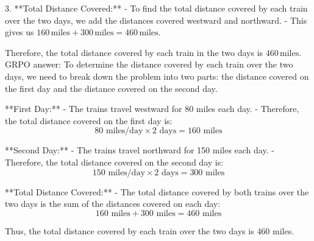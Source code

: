\documentclass[11pt]{article}
\begin{document}
\begin{answerbox}
3. **Total Distance Covered:**
   - To find the total distance covered by each train over the two days, we add the distances covered westward and northward.
   - This gives us $160 \, \text{miles} + 300 \, \text{miles} = 460 \, \text{miles}$.

Therefore, the total distance covered by each train in the two days is $\boxed{460 \, \text{miles}}$.
GRPO answer:
To determine the distance covered by each train over the two days, we need to break down the problem into two parts: the distance covered on the first day and the distance covered on the second day.

**First Day:**
- The trains travel westward for 80 miles each day.
- Therefore, the total distance covered on the first day is:
  \[
  80 \text{ miles/day} \times 2 \text{ days} = 160 \text{ miles}
  \]

**Second Day:**
- The trains travel northward for 150 miles each day.
- Therefore, the total distance covered on the second day is:
  \[
  150 \text{ miles/day} \times 2 \text{ days} = 300 \text{ miles}
  \]

**Total Distance Covered:**
- The total distance covered by both trains over the two days is the sum of the distances covered on each day:
  \[
  160 \text{ miles} + 300 \text{ miles} = 460 \text{ miles}
  \]

Thus, the total distance covered by each train over the two days is \(\boxed{460}\) miles.
\end{answerbox}
\end{document}
